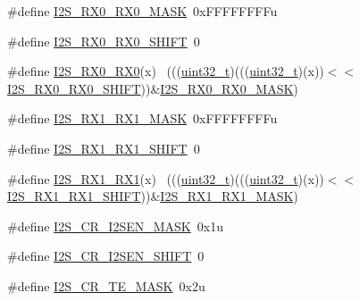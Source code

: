 \begin{DoxyCompactItemize}
\item 
\#define \hyperlink{group___i2_s___register___masks_ga56006d04c24918816ed4a9fb6ba32c77}{I2\+S\+\_\+\+R\+X0\+\_\+\+R\+X0\+\_\+\+M\+A\+SK}~0x\+F\+F\+F\+F\+F\+F\+F\+Fu
\item 
\#define \hyperlink{group___i2_s___register___masks_ga3e7f8dbc058534a0393990b9bdd68c22}{I2\+S\+\_\+\+R\+X0\+\_\+\+R\+X0\+\_\+\+S\+H\+I\+FT}~0
\item 
\#define \hyperlink{group___i2_s___register___masks_ga29d280a4426e5dddf3ecaa71d54ef832}{I2\+S\+\_\+\+R\+X0\+\_\+\+R\+X0}(x)                                                  ~(((\hyperlink{_p_e___types_8h_a33594304e786b158f3fb30289278f5af}{uint32\+\_\+t})(((\hyperlink{_p_e___types_8h_a33594304e786b158f3fb30289278f5af}{uint32\+\_\+t})(x))$<$$<$\hyperlink{group___i2_s___register___masks_ga3e7f8dbc058534a0393990b9bdd68c22}{I2\+S\+\_\+\+R\+X0\+\_\+\+R\+X0\+\_\+\+S\+H\+I\+FT}))\&\hyperlink{group___i2_s___register___masks_ga56006d04c24918816ed4a9fb6ba32c77}{I2\+S\+\_\+\+R\+X0\+\_\+\+R\+X0\+\_\+\+M\+A\+SK})
\item 
\#define \hyperlink{group___i2_s___register___masks_gad7d685f96ffb9077933aa3c31f0a1dfb}{I2\+S\+\_\+\+R\+X1\+\_\+\+R\+X1\+\_\+\+M\+A\+SK}~0x\+F\+F\+F\+F\+F\+F\+F\+Fu
\item 
\#define \hyperlink{group___i2_s___register___masks_ga9e2c29b36a47ff1b795af4cb3c5fb79f}{I2\+S\+\_\+\+R\+X1\+\_\+\+R\+X1\+\_\+\+S\+H\+I\+FT}~0
\item 
\#define \hyperlink{group___i2_s___register___masks_ga7549a554d77ef27772c8cc5a4609d073}{I2\+S\+\_\+\+R\+X1\+\_\+\+R\+X1}(x)                                                  ~(((\hyperlink{_p_e___types_8h_a33594304e786b158f3fb30289278f5af}{uint32\+\_\+t})(((\hyperlink{_p_e___types_8h_a33594304e786b158f3fb30289278f5af}{uint32\+\_\+t})(x))$<$$<$\hyperlink{group___i2_s___register___masks_ga9e2c29b36a47ff1b795af4cb3c5fb79f}{I2\+S\+\_\+\+R\+X1\+\_\+\+R\+X1\+\_\+\+S\+H\+I\+FT}))\&\hyperlink{group___i2_s___register___masks_gad7d685f96ffb9077933aa3c31f0a1dfb}{I2\+S\+\_\+\+R\+X1\+\_\+\+R\+X1\+\_\+\+M\+A\+SK})
\item 
\#define \hyperlink{group___i2_s___register___masks_gadada70e943bd1d2f1cc20c86e976351a}{I2\+S\+\_\+\+C\+R\+\_\+\+I2\+S\+E\+N\+\_\+\+M\+A\+SK}~0x1u
\item 
\#define \hyperlink{group___i2_s___register___masks_ga92bdc8388297ae156c1b20aa24becbac}{I2\+S\+\_\+\+C\+R\+\_\+\+I2\+S\+E\+N\+\_\+\+S\+H\+I\+FT}~0
\item 
\#define \hyperlink{group___i2_s___register___masks_ga354e1253289be8c1387ba3845b15cc85}{I2\+S\+\_\+\+C\+R\+\_\+\+T\+E\+\_\+\+M\+A\+SK}~0x2u

\end{DoxyCompactItemize}
